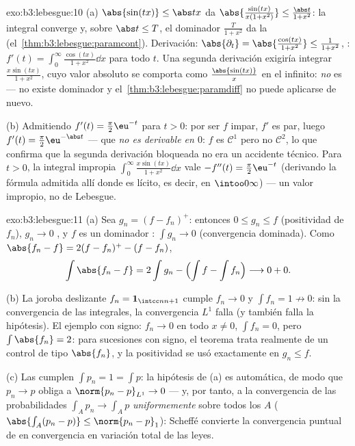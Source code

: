 \begin{solution}{exo:b3:lebesgue:10}
(a) $\abs{\sin(tx)} \leq \abs tx$ da
$\abs{\frac{\sin(tx)}{x(1+x^2)}} \leq \frac{\abs
t}{1+x^2}$: la integral converge y, sobre $\abs t \leq T$, el dominador
$\frac{T}{1+x^2}$ da la 
(el~\cref{thm:b3:lebesgue:paramcont}). Derivación:
$\abs{\partial_t} = \abs{\frac{\cos(tx)}{1+x^2}} \leq
\frac1{1+x^2}$, : $f'(t) =
\int_0^\infty\frac{\cos(tx)}{1+x^2}\dd x$ para todo $t$. Una segunda
derivación exigiría integrar $\frac{x\sin(tx)}{1 +
x^2}$, cuyo valor absoluto se comporta como $\frac{\abs{\sin(tx)}}
x$ en el infinito: \emph{no} es 
--- no existe dominador y el~\cref{thm:b3:lebesgue:paramdiff} no puede
aplicarse de nuevo.

(b) Admitiendo $f'(t) = \frac\pi2\eu^{-t}$ para $t > 0$: por ser $f$
impar, $f'$ es par, luego $f'(t) =
\frac\pi2\eu^{-\abs t}$ --- que \emph{no es derivable en $0$}: $f$ es
$\mathcal C^1$ pero no $\mathcal C^2$, lo que confirma que la segunda
derivación bloqueada no era un accidente técnico. Para $t > 0$, la
integral impropia $\int_0^\infty\frac{x\sin(tx)}{1+x^2}\dd x$ vale
$-f''(t) =
\frac\pi2\eu^{-t}$ (derivando la fórmula admitida allí donde es lícito,
es decir, en $\intoo0\infty$) --- un valor impropio, no de Lebesgue.
\end{solution}

\begin{solution}{exo:b3:lebesgue:11}
(a) Sea $g_n = (f - f_n)^+$: entonces $0 \leq g_n \leq f$ (positividad
de $f_n$), $g_n \to 0$ , y $f$ es un dominador
: $\int g_n \to 0$ (convergencia
dominada). Como
$\abs{f_n - f} = 2(f - f_n)^+ - (f - f_n)$,
\[
\int\abs{f_n - f} = 2\int g_n - \Bigl(\int f - \int
f_n\Bigr) \longrightarrow 0 + 0 .
\]

(b) La joroba deslizante $f_n = \mathbf 1_{\intcc n{n+1}}$ cumple
$f_n \to 0$  y $\int f_n = 1 \not\to 0$: sin la
convergencia de las integrales, la convergencia $L^1$ falla (y también
falla la hipótesis). El ejemplo con signo: $f_n \to 0$ en todo
$x \neq 0$, $\int f_n = 0$, pero $\int\abs{f_n} = 2$: para sucesiones
con signo, el teorema trata realmente de un control de tipo $\abs{f_n}$,
y la positividad se usó exactamente en
$g_n \leq f$.

(c) Las  cumplen $\int p_n = 1 = \int p$: la hipótesis de (a)
es automática, de modo que $p_n \to p$  obliga a
$\norm{p_n - p}_{L^1} \to 0$ --- y, por tanto, a la convergencia de las
probabilidades $\int_Ap_n \to \int_Ap$ \emph{uniformemente} sobre todos
los $A$ 
($\abs{\int_A(p_n - p)} \leq
\norm{p_n - p}_1$): Scheffé convierte la convergencia puntual de
 en convergencia en variación total de las leyes.
\end{solution}

